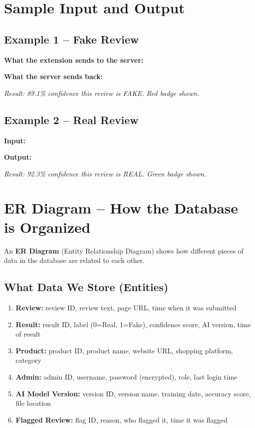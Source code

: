 \documentclass[10pt, a4paper]{report}
\begin{document}
\section{Sample Input and Output}

\subsection{Example 1 -- Fake Review}

\textbf{What the extension sends to the server:}

\textbf{What the server sends back:}

\textit{Result: 89.1\% confidence this review is FAKE. Red badge shown.}

\subsection{Example 2 -- Real Review}

\textbf{Input:}

\textbf{Output:}

\textit{Result: 92.3\% confidence this review is REAL. Green badge shown.}

\section{ER Diagram -- How the Database is Organized}

An \textbf{ER Diagram} (Entity Relationship Diagram) shows how different pieces of data in the database are related to each other.

\subsection{What Data We Store (Entities)}

\begin{enumerate}
  \item \textbf{Review:} review ID, review text, page URL, time when it was submitted
  \item \textbf{Result:} result ID, label (0=Real, 1=Fake), confidence score, AI version, time of result
  \item \textbf{Product:} product ID, product name, website URL, shopping platform, category
  \item \textbf{Admin:} admin ID, username, password (encrypted), role, last login time
  \item \textbf{AI Model Version:} version ID, version name, training date, accuracy score, file location
  \item \textbf{Flagged Review:} flag ID, reason, who flagged it, time it was flagged
\end{enumerate}
\end{document}
